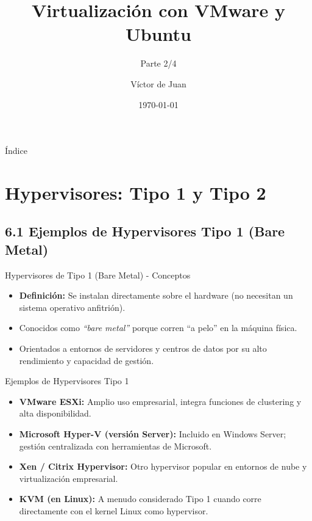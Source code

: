 \documentclass{beamer}
\title{Virtualización con VMware y Ubuntu}
\subtitle{Parte 2/4}
\author{Víctor de Juan}
\date{\today}
\begin{document}
\begin{frame}
	\titlepage
\end{frame}

\begin{frame}{Índice}
	\tableofcontents[
		hideallsubsections]
\end{frame}

\section{Hypervisores: Tipo 1 y Tipo 2}

\subsection{6.1 Ejemplos de Hypervisores Tipo 1 (Bare Metal)}
\begin{frame}{Hypervisores de Tipo 1 (Bare Metal) - Conceptos}
	\begin{itemize}
		\item \textbf{Definición:} Se instalan directamente sobre el hardware (no necesitan un sistema operativo anfitrión).
		\item Conocidos como \textit{“bare metal”} porque corren “a pelo” en la máquina física.
		\item Orientados a entornos de servidores y centros de datos por su alto rendimiento y capacidad de gestión.
	\end{itemize}
\end{frame}

\begin{frame}{Ejemplos de Hypervisores Tipo 1}
	\begin{itemize}
		\item \textbf{VMware ESXi:} Amplio uso empresarial, integra funciones de clustering y alta disponibilidad.
		\item \textbf{Microsoft Hyper-V (versión Server):} Incluido en Windows Server; gestión centralizada con herramientas de Microsoft.
		\item \textbf{Xen / Citrix Hypervisor:} Otro hypervisor popular en entornos de nube y virtualización empresarial.
		\item \textbf{KVM (en Linux):} A menudo considerado Tipo 1 cuando corre directamente con el kernel Linux como hypervisor.
	\end{itemize}
\end{frame}
\end{document}
